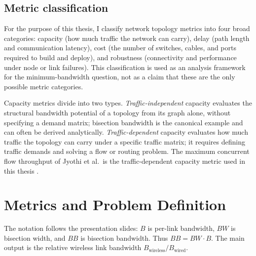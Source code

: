 \documentclass[conference]{IEEEtran}
\begin{document}
\subsection{Metric classification}

For the purpose of this thesis, I classify network topology metrics into four broad categories: capacity (how much traffic the network can carry), delay (path length and communication latency), cost (the number of switches, cables, and ports required to build and deploy), and robustness (connectivity and performance under node or link failures). This classification is used as an analysis framework for the minimum-bandwidth question, not as a claim that these are the only possible metric categories.

Capacity metrics divide into two types. \emph{Traffic-independent} capacity evaluates the structural bandwidth potential of a topology from its graph alone, without specifying a demand matrix; bisection bandwidth is the canonical example and can often be derived analytically. \emph{Traffic-dependent} capacity evaluates how much traffic the topology can carry under a specific traffic matrix; it requires defining traffic demands and solving a flow or routing problem. The maximum concurrent flow throughput of Jyothi et al.\ is the traffic-dependent capacity metric used in this thesis \cite{jyothi2016}.

\section{Metrics and Problem Definition}

The notation follows the presentation slides: \(B\) is per-link bandwidth, \(BW\) is bisection width, and \(BB\) is bisection bandwidth. Thus \(BB = BW \cdot B\). The main output is the relative wireless link bandwidth \(B_{\mathrm{wireless}}/B_{\mathrm{wired}}\).
\end{document}
